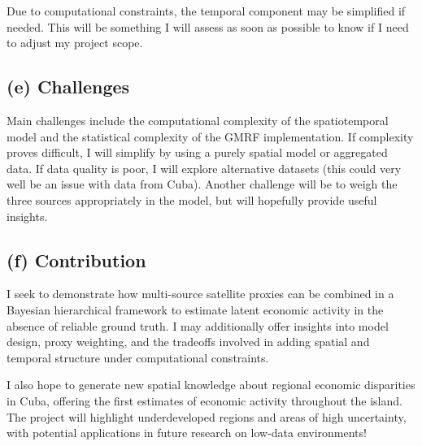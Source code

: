 \documentclass[12pt]{article}
\begin{document}
Due to computational constraints, the temporal component may be simplified if needed. This will be something I will assess as soon as possible to know if I need to adjust my project scope.

\subsection*{(e) Challenges}
Main challenges include the computational complexity of the spatiotemporal model and the statistical complexity of the GMRF implementation. If complexity proves difficult, I will simplify by using a purely spatial model or aggregated data. If data quality is poor, I will explore alternative datasets (this could very well be an issue with data from Cuba).  Another challenge will be to weigh the three sources appropriately in the model, but will hopefully provide useful insights.

\subsection*{(f) Contribution}
I seek to demonstrate how multi-source satellite proxies can be combined in a Bayesian hierarchical framework to estimate latent economic activity in the absence of reliable ground truth. I may additionally offer insights into model design, proxy weighting, and the tradeoffs involved in adding spatial and temporal structure under computational constraints.

I also hope to generate new spatial knowledge about regional economic disparities in Cuba, offering the first estimates of economic activity throughout the island. The project will highlight underdeveloped regions and areas of high uncertainty, with potential applications in future research on low-data environments!


\newpage
\printbibliography
\end{document}
